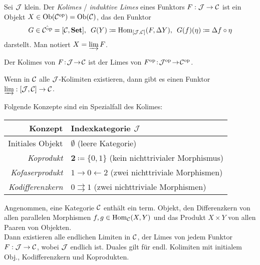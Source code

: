 \documentclass{cheat-sheet}
\begin{document}

\begin{defn}
  Sei $\mathcal{J}$ klein.
  Der \emph{Kolimes} / \emph{induktive Limes} eines Funktors $F : \mathcal{J} \to \mathcal{C}$ ist ein Objekt $X \in \operatorname{Ob}(\mathcal{C}^{\mathrm{op}}) = \operatorname{Ob}(\mathcal{C})$, das den Funktor
  \[
    G \in \hat{\mathcal{C}^{\mathrm{op}}} = [\mathcal{C}, \mathbf{Set}], \enspace
    G(Y) \coloneqq \operatorname{Hom}_{[\mathcal{J}, \mathcal{C}]}(F, \Delta Y), \enspace
    G(f)(\eta) \coloneqq \Delta f \circ \eta
  \]
  darstellt. Man notiert $X = \varinjlim F$.
\end{defn}

\begin{bem}
  Der Kolimes von $F \!:\! \mathcal{J} \!\to\! \mathcal{C}$ ist der Limes von $F^{\mathrm{op}} \!:\! \mathcal{J}^{\mathrm{op}} \!\to\! \mathcal{C}^{\mathrm{op}}$.
\end{bem}

\begin{bem}
  Wenn in $\mathcal{C}$ alle $\mathcal{J}$-Kolimiten existieren, dann gibt es einen Funktor $\varinjlim : [\mathcal{J}, \mathcal{C}] \to \mathcal{C}$.
\end{bem}

\begin{bem}
  Folgende Konzepte sind ein Spezialfall des Kolimes:
  \begin{center}
    \begin{tabular}{ | r | l | }
      \hline
      Konzept & Indexkategorie $\mathcal{J}$ \\ \hline
      Initiales Objekt & $\emptyset$ (leere Kategorie) \\
      \emph{Koprodukt} & $\mathbf{2} \coloneqq \{ 0, 1 \}$ (kein nichttrivialer Morphismus) \\
      \emph{Kofaserprodukt} & $1 \to 0 \leftarrow 2$ (zwei nichttriviale Morphismen) \\
      \emph{Kodifferenzkern} &  $0 \rightrightarrows 1$ (zwei nichttriviale Morphismen) \\ \hline
    \end{tabular}
  \end{center}
\end{bem}

\begin{satz}
  Angenommen, eine Kategorie $\mathcal{C}$ enthält ein term. Objekt, den Differenzkern von allen parallelen Morphismen $f, g \in \operatorname{Hom}_{\mathcal{C}}(X, Y)$ und das Produkt $X \times Y$ von allen Paaren von Objekten. \\
  Dann existieren alle endlichen Limiten in $\mathcal{C}$, \dh{} der Limes von jedem Funktor $F : \mathcal{J} \to \mathcal{C}$, wobei $\mathcal{J}$ endlich ist.
  Duales gilt für endl. Kolimiten mit initialem Obj., Kodifferenzkern und Koprodukten.
\end{satz}
\end{document}
